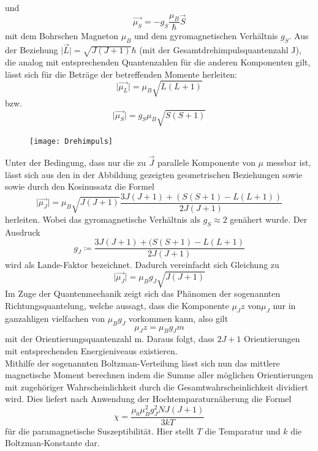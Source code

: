 und
\begin{equation*}
\vec{\mu_S}=-g_S\frac{\mu_B}{\hbar}\vec{S}
\end{equation*}
mit dem Bohrschen Magneton $\mu_B$ und dem gyromagnetischen Verhältnis $g_S$. Aus der Beziehung $\lvert \vec{L} \rvert=\sqrt{J(J+1)}\hbar$ (mit der Gesamtdrehimpulsquantenzahl J), die analog mit entsprechenden Quantenzahlen für die anderen Komponenten gilt, lässt sich für die Beträge der betreffenden Momente herleiten:
\begin{equation*}
\lvert \vec{\mu_L}\rvert=\mu_B\sqrt{L(L+1)}
\end{equation*}
bzw.
\begin{equation*}
\lvert \vec{\mu_S}\rvert=g_S\mu_B\sqrt{S(S+1)}
\end{equation*}
\begin{figure}[h]
    \centering
    \texttt{[image: Drehimpuls]}
    \label{Drehimpuls}
  \end{figure}
Unter der Bedingung, dass nur die zu $\vec{J}$ parallele Komponente von $\mu$ messbar ist, lässt sich aus den in der Abbildung gezeigten geometrischen Beziehungen sowie sowie durch den Kosinussatz die Formel
\begin{equation*}
\lvert \vec{\mu_J} \rvert=\mu_B\sqrt{J(J+1)}\frac{3J(J+1)+(S(S+1)-L(L+1))}{2J(J+1)}
\end{equation*}
herleiten. Wobei das gyromagnetische Verhältnis als $g_S\approx2$ genähert wurde. Der Ausdruck
\begin{equation}
  \label{eq:landre}
g_J\coloneq\frac{3J(J+1)+(S(S+1)-L(L+1)}{2J(J+1)}
\end{equation}
wird als Lande-Faktor bezeichnet. Dadurch vereinfacht sich Gleichung zu
\begin{equation}
\lvert \vec{\mu_J} \rvert=\mu_Bg_J\sqrt{J(J+1)}
\end{equation}
Im Zuge der Quantenmechanik zeigt sich das Phänomen der sogenannten Richtungsquantelung, welche aussagt, dass die Komponente $\mu_Jz$ von$\mu_J$ nur in ganzahligen vielfachen von $\mu_Bg_J$ vorkommen kann, also gilt
\begin{equation*}
\mu_Jz=\mu_Bg_Jm
\end{equation*}
mit der Orientierungsquantenzahl m. Daraus folgt, dass $2J+1$ Orientierungen mit entsprechenden Energieniveaus existieren. \\ 
Mithilfe der sogenannten Boltzman-Verteilung lässt sich nun das mittlere magnetische Moment berechnen indem die Summe aller möglichen Orientierungen mit zugehöriger Wahrscheinlichkeit durch die Gesamtwahrscheinlichkeit dividiert wird. Dies liefert nach Anwendung der Hochtemparaturnäherung die Formel 
\begin{equation}
  \label{eq:xi}
\chi=\frac{\mu_0\mu_B^2g_J^2NJ(J+1)}{3kT}
\end{equation}
für die paramagnetische Suszeptibilität. Hier stellt $T$ die Temparatur und $k$ die Boltzman-Konstante dar.
